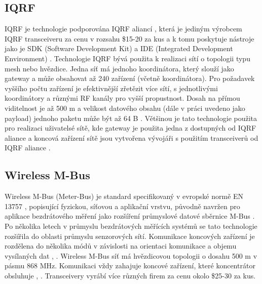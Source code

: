 \subsection{IQRF}
IQRF je technologie podporována IQRF aliancí \cite{iqrf_alliance}, která je jediným výrobcem IQRF transceiveru \cite{iqrf_transceivers} za cenu v rozsahu \$15-20 za kus a k tomu poskytuje nástroje jako je SDK (Software Development Kit) \cite{iqrf_sdk} a IDE (Integrated Development Environment) \cite{iqrf_ide}.
Technologie IQRF bývá použita k realizaci sítí o topologii typu mesh nebo hvězdice.
Jedna síť má jednoho koordinátora, který slouží jako gateway a může obsahovat až 240 zařízení (včetně koordinátora). Pro požadavek vyššího počtu zařízení je efektivnější zřetězit více sítí, s jednotlivými koordinátory a různými RF kanály pro vyšší propustnost.
Dosah na přímou viditelnost je až 500 m a velikost datového obsahu (dále v práci uvedeno jako payload) jednoho paketu může být až 64 B \cite{iqrf_rf}.
Většinou je tato technologie použita pro realizaci uživatelsé sítě, kde gateway je použita jedna z dostupných od IQRF aliance a koncová zařízení sítě jsou vytvořena vývojáři s použitím transceiverů od IQRF aliance
\cite{paper_iqrf}.



\subsection{Wireless M-Bus}
Wireless M-Bus (Meter-Bus) je standard specifikovaný v evropské normě EN 13757 \cite{EN 13757}, popisující fyzickou, síťovou a aplikační vrstvu, původně navržen pro aplikace bezdrátového měření jako rozšíření průmyslové datové sběrnice M-Bus \cite{wirelessMBus_automatizace}.
Po několika letech v průmyslu bezdrátových měřících systémů se tato technologie rozšířila do oblasti průmyslu senzorových sítí.
Komunikace koncových zařízení je rozdělena do několika módů v závislosti na orientaci komunikace a objemu vysílaných dat \cite{wirelessMBus01}, \cite{wirelessMBus02}. 
Wireless M-Bus síť má hvězdicovou topologii o dosahu 500 m v pásmu 868 MHz.
Komunikaci vždy zahajuje koncové zařízení, které koncentrátor obsluhuje \cite{wirelessMBus03}, \cite{wirelessMBus04}.
Transceivery vyrábí více různých firem za cenu okolo \$25-30 za kus.


